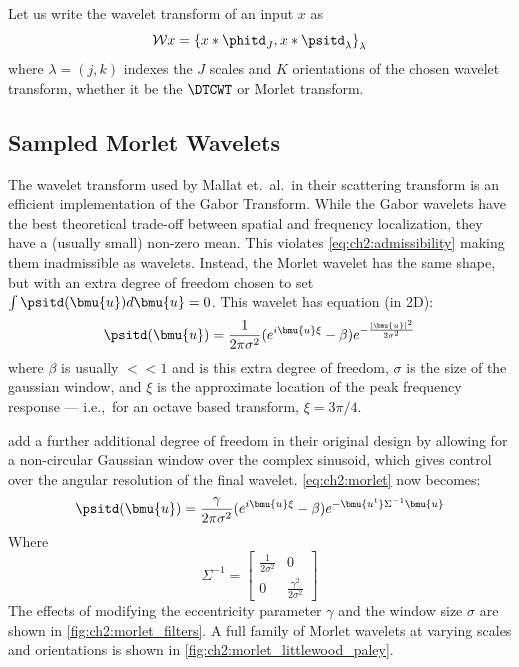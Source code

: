 Let us write the wavelet transform of an input $x$ as 
\begin{equation}
  \mathcal{W}x = \left\{x \ast \phitd_J, x \ast \psitd_{\lambda}
  \right\}_{\lambda} \label{eq:ch2:wave2}
\end{equation}
where $\lambda = (j, k)$ indexes the $J$ scales and $K$ orientations of the
chosen wavelet transform, whether it be the $\DTCWT$ or Morlet transform.

\subsection{Sampled Morlet Wavelets}\label{sec:ch2:morlet_fourier}
  The wavelet transform used by Mallat et.\ al.\ in their scattering transform is an efficient
  implementation of the Gabor Transform.  While the Gabor wavelets have the best
  theoretical trade-off between spatial and frequency localization, they have a
  (usually small) non-zero mean.  This violates \eqref{eq:ch2:admissibility} making them
  inadmissible as wavelets. Instead, the Morlet wavelet has the same shape, but
  with an extra degree of freedom chosen to set $\int \psitd (\bmu{u}) d\bmu{u}
  =0$. This wavelet has equation (in 2D):
  \begin{equation}
    \psitd(\bmu{u}) = \frac{1}{2\pi\sigma^2} {(e^{i\bmu{u}\xi} - \beta)}
                     e^{-\frac{|\bmu{u}|^2}{2\sigma^2}} 
    \label{eq:ch2:morlet}
  \end{equation}
  where $\beta$ is usually $<<1$ and is this extra degree of freedom, 
  $\sigma$ is the size of the gaussian window, and $\xi$ is the
  approximate location of the peak frequency response --- i.e.,\ for an octave based
  transform, $\xi = 3\pi/4$.

  \citeauthor{bruna_invariant_2013} add a further additional degree of freedom in their 
  original design \cite{bruna_invariant_2013} by allowing for a non-circular
  Gaussian window over the complex sinusoid, which gives control over the angular
  resolution of the final wavelet. \eqref{eq:ch2:morlet} now becomes:
  \begin{equation}
    \psitd(\bmu{u}) = \frac{\gamma}{2\pi\sigma^2}{(e^{i\bmu{u}\xi} - \beta)}
                  e^{-\bmu{u^t}\Sigma^{-1}  \bmu{u}} 
    \label{eq:ch2:morlet_slant}
  \end{equation}
  Where
  $$\Sigma^{-1} = \left[ \begin{smallmatrix} 
      \frac{1}{2\sigma^2} & 0 \\ 
      0 & \frac{\gamma^2}{2\sigma^2} 
      \end{smallmatrix} \right] $$
  The effects of modifying the eccentricity parameter $\gamma$ and the window size
  $\sigma$ are shown in \autoref{fig:ch2:morlet_filters}. A full family of
  Morlet wavelets at varying scales and orientations is shown in 
  \autoref{fig:ch2:morlet_littlewood_paley}.

